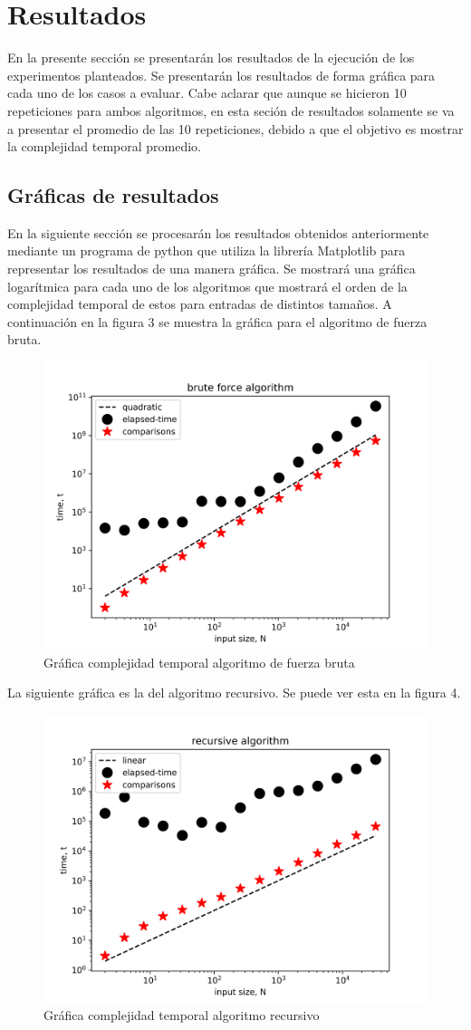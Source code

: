 \section{Resultados}
En la presente sección se presentarán los resultados de la ejecución de los experimentos planteados. Se presentarán los resultados de forma gráfica para cada uno de los casos a evaluar. Cabe aclarar que aunque se hicieron 10 repeticiones para ambos algoritmos, en esta seción de resultados solamente se va a presentar el promedio de las 10 repeticiones, debido a que el objetivo es mostrar la complejidad temporal promedio. \\


\subsection{Gráficas de resultados}
En la siguiente sección se procesarán los resultados obtenidos anteriormente mediante un programa de python que utiliza la librería Matplotlib para representar los resultados de una manera gráfica. Se mostrará una gráfica logarítmica para cada uno de los algoritmos que mostrará el orden de la complejidad temporal de estos para entradas de distintos tamaños. A continuación en la figura 3 se muestra la gráfica para el algoritmo de fuerza bruta.\\
\begin{figure}[!htbp]
    \centering
    \includegraphics[width=.7\textwidth,height=.5\textwidth]{figures/brute force.png}
    \caption{Gráfica complejidad temporal algoritmo de fuerza bruta}
    \label{fig:my_label}
\end{figure}
La siguiente gráfica es la del algoritmo recursivo. Se puede ver esta en la figura 4.\\
\begin{figure}[!htbp]
    \centering
    \includegraphics[width=.7\textwidth,height=.5\textwidth]{figures/recursive.png}
    \caption{Gráfica complejidad temporal algoritmo recursivo}
    \label{fig:my_label}
\end{figure}